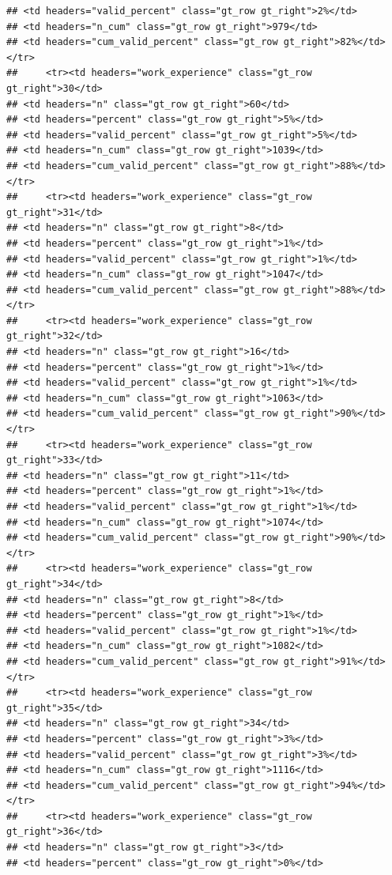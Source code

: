 \documentclass[
  a4paper,
  DIV=11,
  numbers=noendperiod]{scrartcl}
\begin{document}
\begin{verbatim}
## <td headers="valid_percent" class="gt_row gt_right">2%</td>
## <td headers="n_cum" class="gt_row gt_right">979</td>
## <td headers="cum_valid_percent" class="gt_row gt_right">82%</td></tr>
##     <tr><td headers="work_experience" class="gt_row gt_right">30</td>
## <td headers="n" class="gt_row gt_right">60</td>
## <td headers="percent" class="gt_row gt_right">5%</td>
## <td headers="valid_percent" class="gt_row gt_right">5%</td>
## <td headers="n_cum" class="gt_row gt_right">1039</td>
## <td headers="cum_valid_percent" class="gt_row gt_right">88%</td></tr>
##     <tr><td headers="work_experience" class="gt_row gt_right">31</td>
## <td headers="n" class="gt_row gt_right">8</td>
## <td headers="percent" class="gt_row gt_right">1%</td>
## <td headers="valid_percent" class="gt_row gt_right">1%</td>
## <td headers="n_cum" class="gt_row gt_right">1047</td>
## <td headers="cum_valid_percent" class="gt_row gt_right">88%</td></tr>
##     <tr><td headers="work_experience" class="gt_row gt_right">32</td>
## <td headers="n" class="gt_row gt_right">16</td>
## <td headers="percent" class="gt_row gt_right">1%</td>
## <td headers="valid_percent" class="gt_row gt_right">1%</td>
## <td headers="n_cum" class="gt_row gt_right">1063</td>
## <td headers="cum_valid_percent" class="gt_row gt_right">90%</td></tr>
##     <tr><td headers="work_experience" class="gt_row gt_right">33</td>
## <td headers="n" class="gt_row gt_right">11</td>
## <td headers="percent" class="gt_row gt_right">1%</td>
## <td headers="valid_percent" class="gt_row gt_right">1%</td>
## <td headers="n_cum" class="gt_row gt_right">1074</td>
## <td headers="cum_valid_percent" class="gt_row gt_right">90%</td></tr>
##     <tr><td headers="work_experience" class="gt_row gt_right">34</td>
## <td headers="n" class="gt_row gt_right">8</td>
## <td headers="percent" class="gt_row gt_right">1%</td>
## <td headers="valid_percent" class="gt_row gt_right">1%</td>
## <td headers="n_cum" class="gt_row gt_right">1082</td>
## <td headers="cum_valid_percent" class="gt_row gt_right">91%</td></tr>
##     <tr><td headers="work_experience" class="gt_row gt_right">35</td>
## <td headers="n" class="gt_row gt_right">34</td>
## <td headers="percent" class="gt_row gt_right">3%</td>
## <td headers="valid_percent" class="gt_row gt_right">3%</td>
## <td headers="n_cum" class="gt_row gt_right">1116</td>
## <td headers="cum_valid_percent" class="gt_row gt_right">94%</td></tr>
##     <tr><td headers="work_experience" class="gt_row gt_right">36</td>
## <td headers="n" class="gt_row gt_right">3</td>
## <td headers="percent" class="gt_row gt_right">0%</td>

\end{verbatim}
\end{document}
